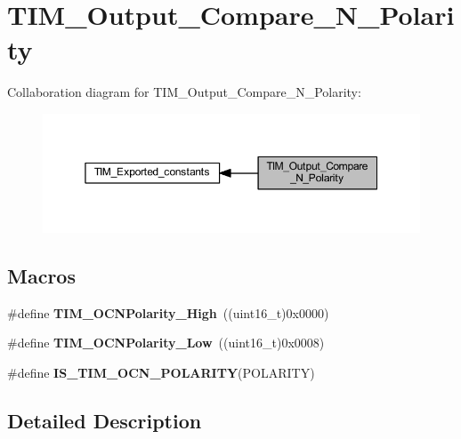 \hypertarget{group___t_i_m___output___compare___n___polarity}{}\section{T\+I\+M\+\_\+\+Output\+\_\+\+Compare\+\_\+\+N\+\_\+\+Polarity}
\label{group___t_i_m___output___compare___n___polarity}
Collaboration diagram for T\+I\+M\+\_\+\+Output\+\_\+\+Compare\+\_\+\+N\+\_\+\+Polarity\+:\nopagebreak
\begin{figure}[H]
\begin{center}
\leavevmode
\includegraphics[width=350pt]{group___t_i_m___output___compare___n___polarity}
\end{center}
\end{figure}
\subsection*{Macros}
\begin{DoxyCompactItemize}
\item 
\mbox{\label{group___t_i_m___output___compare___n___polarity_gaa62288888d4f6858bee6b3cd9086ae3f}} 
\#define {\bfseries T\+I\+M\+\_\+\+O\+C\+N\+Polarity\+\_\+\+High}~((uint16\+\_\+t)0x0000)
\item 
\mbox{\label{group___t_i_m___output___compare___n___polarity_ga9582560b2e7dae2e8dc3b65909b0c9cf}} 
\#define {\bfseries T\+I\+M\+\_\+\+O\+C\+N\+Polarity\+\_\+\+Low}~((uint16\+\_\+t)0x0008)
\item 
\#define {\bfseries I\+S\+\_\+\+T\+I\+M\+\_\+\+O\+C\+N\+\_\+\+P\+O\+L\+A\+R\+I\+TY}(P\+O\+L\+A\+R\+I\+TY)
\end{DoxyCompactItemize}


\subsection{Detailed Description}


